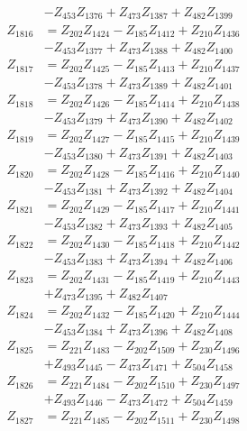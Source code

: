 \begin{multicols}{2}
\begin{align}
&- Z_{453}Z_{1376} + Z_{473}Z_{1387} + Z_{482}Z_{1399} \nonumber \\
Z_{1816} &= Z_{202}Z_{1424} - Z_{185}Z_{1412} + Z_{210}Z_{1436}  \nonumber \\
&- Z_{453}Z_{1377} + Z_{473}Z_{1388} + Z_{482}Z_{1400} \nonumber \\
Z_{1817} &= Z_{202}Z_{1425} - Z_{185}Z_{1413} + Z_{210}Z_{1437}  \nonumber \\
&- Z_{453}Z_{1378} + Z_{473}Z_{1389} + Z_{482}Z_{1401} \nonumber \\
Z_{1818} &= Z_{202}Z_{1426} - Z_{185}Z_{1414} + Z_{210}Z_{1438}  \nonumber \\
&- Z_{453}Z_{1379} + Z_{473}Z_{1390} + Z_{482}Z_{1402} \nonumber \\
Z_{1819} &= Z_{202}Z_{1427} - Z_{185}Z_{1415} + Z_{210}Z_{1439}  \nonumber \\
&- Z_{453}Z_{1380} + Z_{473}Z_{1391} + Z_{482}Z_{1403} \nonumber \\
Z_{1820} &= Z_{202}Z_{1428} - Z_{185}Z_{1416} + Z_{210}Z_{1440}  \nonumber \\
&- Z_{453}Z_{1381} + Z_{473}Z_{1392} + Z_{482}Z_{1404} \nonumber \\
Z_{1821} &= Z_{202}Z_{1429} - Z_{185}Z_{1417} + Z_{210}Z_{1441}  \nonumber \\
&- Z_{453}Z_{1382} + Z_{473}Z_{1393} + Z_{482}Z_{1405} \nonumber \\
Z_{1822} &= Z_{202}Z_{1430} - Z_{185}Z_{1418} + Z_{210}Z_{1442}  \nonumber \\
&- Z_{453}Z_{1383} + Z_{473}Z_{1394} + Z_{482}Z_{1406} \nonumber \\
Z_{1823} &= Z_{202}Z_{1431} - Z_{185}Z_{1419} + Z_{210}Z_{1443}  \nonumber \\
&+ Z_{473}Z_{1395} + Z_{482}Z_{1407} \nonumber \\
Z_{1824} &= Z_{202}Z_{1432} - Z_{185}Z_{1420} + Z_{210}Z_{1444}  \nonumber \\
&- Z_{453}Z_{1384} + Z_{473}Z_{1396} + Z_{482}Z_{1408} \nonumber \\
Z_{1825} &= Z_{221}Z_{1483} - Z_{202}Z_{1509} + Z_{230}Z_{1496}  \nonumber \\
&+ Z_{493}Z_{1445} - Z_{473}Z_{1471} + Z_{504}Z_{1458} \nonumber \\
Z_{1826} &= Z_{221}Z_{1484} - Z_{202}Z_{1510} + Z_{230}Z_{1497}  \nonumber \\
&+ Z_{493}Z_{1446} - Z_{473}Z_{1472} + Z_{504}Z_{1459} \nonumber \\
Z_{1827} &= Z_{221}Z_{1485} - Z_{202}Z_{1511} + Z_{230}Z_{1498}  \nonumber \\

\end{align}
\end{multicols}
